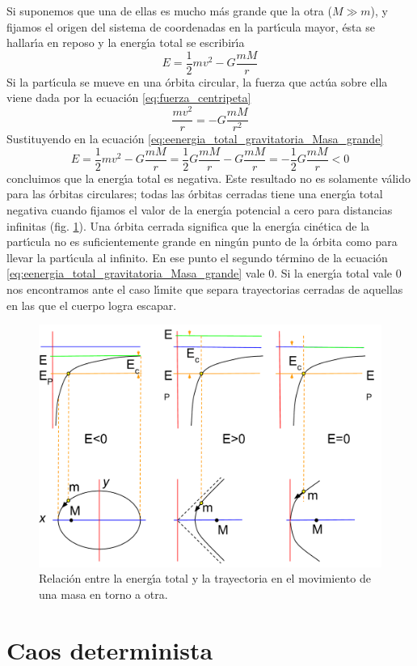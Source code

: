 Si suponemos que una de ellas es mucho m\'as grande que la otra ($M\gg m$), y fijamos el origen del sistema de coordenadas en la part\'\i{}cula mayor, \'esta se hallar\'\i{}a en reposo y la energ\'\i{}a total se escribir\'\i{}a
\begin{equation}
E=\frac{1}{2}mv^2-G\frac{mM}{r}
\label{eq:eenergia_total_gravitatoria_Masa_grande}
\end{equation}
Si la part\'\i{}cula se mueve en una \'orbita circular, la fuerza que act\'ua sobre ella viene dada por la ecuaci\'on \ref{eq:fuerza_centripeta}
\begin{equation}
\frac{mv^2}{r}=-G\frac{mM}{r^2}
\label{eq:fuerza_centripeta_gravedad}
\end{equation}
Sustituyendo en la ecuaci\'on \ref{eq:eenergia_total_gravitatoria_Masa_grande}
\begin{equation}
E=\frac{1}{2}mv^2-G\frac{mM}{r}=\frac{1}{2}G\frac{mM}{r}-G\frac{mM}{r}=-\frac{1}{2}G\frac{mM}{r}<0
\label{eq:eenergia_total_orbitacircular}
\end{equation}
concluimos que la energ\'\i{}a total es negativa. Este resultado no es solamente v\'alido para las \'orbitas circulares; todas las \'orbitas cerradas tiene una energ\'\i{}a total negativa cuando fijamos el valor de la energ\'\i{}a potencial a cero para distancias infinitas (fig. \ref{fig:EnergiaTrayectoria}). Una \'orbita cerrada significa que la energ\'\i{}a cin\'etica de la part\'\i{}cula no es suficientemente grande en ning\'un punto de la \'orbita como para llevar la part\'\i{}cula al infinito. En ese punto el segundo t\'ermino de la ecuaci\'on \ref{eq:eenergia_total_gravitatoria_Masa_grande} vale $0$. 
Si la energ\'\i{}a total vale $0$ nos encontramos ante el caso l\'\i{}mite que separa trayectorias cerradas de aquellas en las que el cuerpo logra escapar.
\begin{figure}[h]
  \includegraphics[width=\linewidth]{EnergiaTrayectoria.pdf}
  \caption{Relaci\'on entre la energ\'\i{}a total y la trayectoria en el movimiento de una masa en torno a otra.}
  \label{fig:EnergiaTrayectoria}
\end{figure}


\section{Caos determinista}


